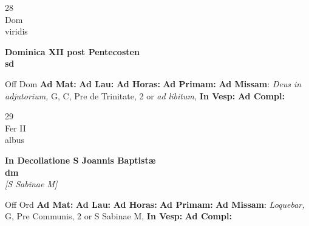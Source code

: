 \documentclass[10pt, openany]{book}
\begin{document}
    \begin{center}
        \begin{minipage}{3.5in}
            \vspace{2em}
            \begin{minipage}{0.5in}
                {\Huge 28} \\
                {\normalsize Dom} \\
                {\normalsize viridis}
            \end{minipage}
            \begin{minipage}{3.0in}
                \textbf{ \large Dominica XII post Pentecosten \\
                \textnormal{\normalsize sd}} \\ 
            \end{minipage}
            \begin{justify}Off Dom
                \textbf{Ad Mat: }
                \textbf{Ad Lau: }
                \textbf{Ad Horas: }
                \textbf{Ad Primam: }\textbf{Ad Missam}: \textit{Deus in adjutorium,} G, C, Pre de Trinitate, 2 or \textit{ad libitum,}  
                \textbf{In Vesp: }
                \textbf{Ad Compl: }
            \end{justify}
        \end{minipage}
    \end{center}

    \begin{center}
        \begin{minipage}{3.5in}
            \vspace{2em}
            \begin{minipage}{0.5in}
                {\Huge 29} \\
                {\normalsize Fer II} \\
                {\normalsize albus}
            \end{minipage}
            \begin{minipage}{3.0in}
                \textbf{ \large In Decollatione S Joannis Baptistæ \\
                \textnormal{\normalsize dm}} \\ \textit{[S Sabinae M]} \\ 
            \end{minipage}
            \begin{justify}Off Ord
                \textbf{Ad Mat: }
                \textbf{Ad Lau: }
                \textbf{Ad Horas: }
                \textbf{Ad Primam: }\textbf{Ad Missam}: \textit{Loquebar,} G, Pre Communis, 2 or S Sabinae M,  
                \textbf{In Vesp: }
                \textbf{Ad Compl: }
            \end{justify}
        \end{minipage}
    \end{center}
\end{document}
